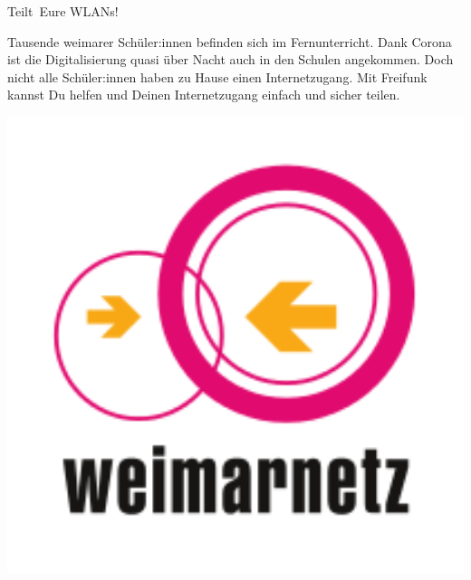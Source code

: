 \documentclass[10pt,a4paper,notumble]{leaflet}
\begin{document}


\begin{center}
{\fontsize{70}{90}\selectfont \faWifi}
\end{center}
\begin{center}
{\fontsize{30}{40}\selectfont Teilt\ Eure WLANs!}
\end{center}

\vfill

{\fontsize{16}{18}\selectfont Tausende weimarer Schüler:innen befinden sich im Fernunterricht. Dank Corona ist die Digitalisierung quasi über Nacht auch in den Schulen angekommen. Doch nicht alle Schüler:innen haben zu Hause einen Internetzugang. Mit Freifunk kannst Du helfen und Deinen Internetzugang einfach und sicher teilen.\par}

\vspace{4em}

\begin{center}
\includegraphics[width=204mm]{weimarnetz_logo.png}
\end{center}
\end{document}
